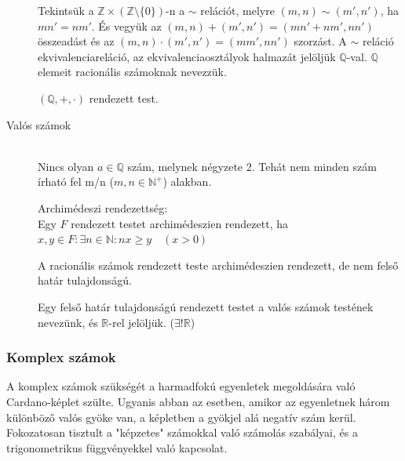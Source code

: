\documentclass[margin=0px]{article}
\newcommand{\N}{\mathbb{N}}
\newcommand{\Z}{\mathbb{Z}}
\newcommand{\R}{\mathbb{R}}
\newcommand{\Q}{\mathbb{Q}}
\begin{document}
\begin{description}
						Tekintsük a $\Z \times (\Z\setminus\{0\})$-n a $\sim$ relációt, melyre $(m,n) \sim (m',n')$, ha $mn' = nm'$. És vegyük az $(m,n)+(m',n') = (mn'+nm', nn')$ összeadást és az $(m,n)\cdot(m',n')=(mm', nn')$ szorzást. A $\sim$ reláció ekvivalenciareláció, az ekvivalenciaosztályok halmazát jelöljük $\Q$-val. $\Q$ elemeit racionális számoknak nevezzük.  
						
						$(\Q, +, \cdot)$ rendezett test.
					\item[Valós számok] \hfill \\
						Nincs olyan $a \in \Q$ szám, melynek négyzete 2. Tehát nem minden szám írható fel m/n ($m,n \in \N^+$) alakban.
						
						Archimédeszi rendezettség:\\
						Egy $F$ rendezett testet archimédeszien rendezett, ha $x,y\in F: \exists n \in \N : nx \geq y \quad (x>0)$
						
						A racionális számok rendezett teste archimédeszien rendezett, de nem felső határ tulajdonságú.
						
						Egy felső határ tulajdonságú rendezett testet a valós számok testének nevezünk, és $\R$-rel jelöljük. ($\exists!\R$)
				\end{description}
			\subsubsection{Komplex számok}
				A komplex számok szükségét a harmadfokú egyenletek megoldására való Cardano-képlet szülte. Ugyanis abban az esetben, amikor az egyenletnek három különböző valós gyöke van, a képletben a gyökjel alá negatív szám kerül. Fokozatosan tisztult a "képzetes" számokkal való számolás szabályai, és a trigonometrikus függvényekkel való kapcsolat.
				
\end{document}
